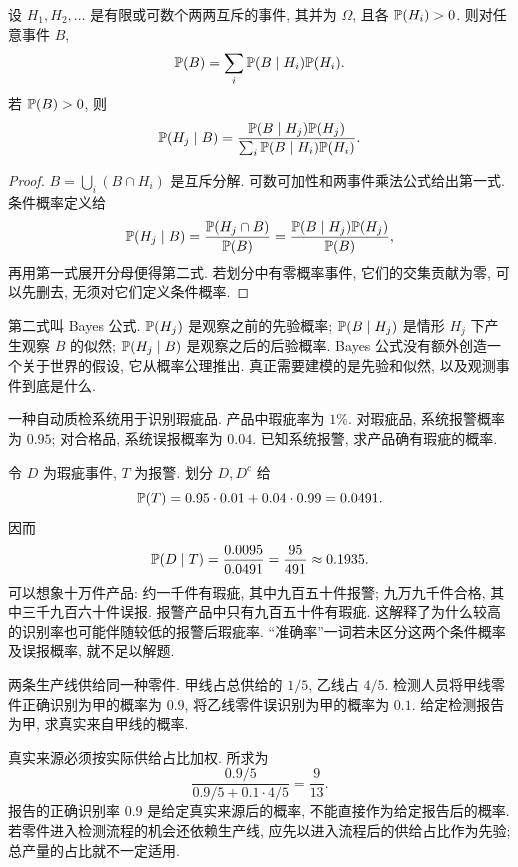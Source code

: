 \begin{theorem}[全概率公式]
设 $H_1,H_2,\ldots$ 是有限或可数个两两互斥的事件, 其并为 $\Omega$, 且各 $\mathbb P(H_i)>0$. 则对任意事件 $B$,
\[
 \mathbb P(B)=\sum_i\mathbb P(B\mid H_i)\mathbb P(H_i).
\]
若 $\mathbb P(B)>0$, 则
\[
 \mathbb P(H_j\mid B)=
 \frac{\mathbb P(B\mid H_j)\mathbb P(H_j)}
 {\sum_i\mathbb P(B\mid H_i)\mathbb P(H_i)}.
\]
\end{theorem}
\begin{proof}
$B=\bigcup_i(B\cap H_i)$ 是互斥分解. 可数可加性和两事件乘法公式给出第一式. 条件概率定义给
\[
 \mathbb P(H_j\mid B)=\frac{\mathbb P(H_j\cap B)}{\mathbb P(B)}
 =\frac{\mathbb P(B\mid H_j)\mathbb P(H_j)}{\mathbb P(B)},
\]
再用第一式展开分母便得第二式. 若划分中有零概率事件, 它们的交集贡献为零, 可以先删去, 无须对它们定义条件概率.
\end{proof}
第二式叫 Bayes 公式. $\mathbb P(H_j)$ 是观察之前的先验概率; $\mathbb P(B\mid H_j)$ 是情形 $H_j$ 下产生观察 $B$ 的似然; $\mathbb P(H_j\mid B)$ 是观察之后的后验概率. Bayes 公式没有额外创造一个关于世界的假设, 它从概率公理推出. 真正需要建模的是先验和似然, 以及观测事件到底是什么.

\begin{example}
一种自动质检系统用于识别瑕疵品. 产品中瑕疵率为 $1\%$. 对瑕疵品, 系统报警概率为 $0.95$; 对合格品, 系统误报概率为 $0.04$. 已知系统报警, 求产品确有瑕疵的概率.
\end{example}
\begin{solution}
令 $D$ 为瑕疵事件, $T$ 为报警. 划分 $D,D^c$ 给
\[
 \mathbb P(T)=0.95\cdot0.01+0.04\cdot0.99=0.0491.
\]
因而
\[
 \mathbb P(D\mid T)=\frac{0.0095}{0.0491}=\frac{95}{491}\approx0.1935.
\]
可以想象十万件产品: 约一千件有瑕疵, 其中九百五十件报警; 九万九千件合格, 其中三千九百六十件误报. 报警产品中只有九百五十件有瑕疵. 这解释了为什么较高的识别率也可能伴随较低的报警后瑕疵率. ``准确率''一词若未区分这两个条件概率及误报概率, 就不足以解题.
\end{solution}

\begin{example}
两条生产线供给同一种零件. 甲线占总供给的 $1/5$, 乙线占 $4/5$. 检测人员将甲线零件正确识别为甲的概率为 $0.9$, 将乙线零件误识别为甲的概率为 $0.1$. 给定检测报告为甲, 求真实来自甲线的概率.
\end{example}
\begin{solution}
真实来源必须按实际供给占比加权. 所求为
\[
 \frac{0.9/5}{0.9/5+0.1\cdot4/5}=\frac9{13}.
\]
报告的正确识别率 $0.9$ 是给定真实来源后的概率, 不能直接作为给定报告后的概率. 若零件进入检测流程的机会还依赖生产线, 应先以进入流程后的供给占比作为先验; 总产量的占比就不一定适用.
\end{solution}

